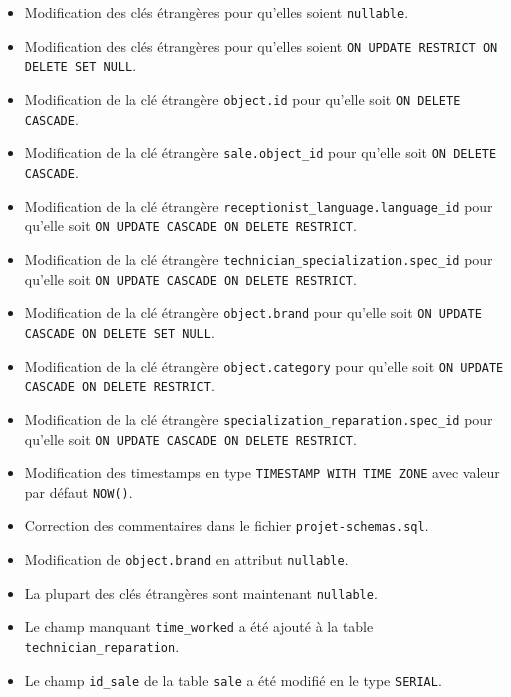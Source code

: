 \documentclass{article}
\newcommand{\ttt}{\texttt}
\begin{document}
\begin{itemize}
    \item Modification des clés étrangères pour qu'elles soient \ttt{nullable}.
    \item Modification des clés étrangères pour qu'elles soient \ttt{ON UPDATE RESTRICT ON DELETE SET NULL}.
    \item Modification de la clé étrangère \ttt{object.id} pour qu'elle soit \ttt{ON DELETE CASCADE}.
    \item Modification de la clé étrangère \ttt{sale.object\_id} pour qu'elle soit \ttt{ON DELETE CASCADE}.
    \item Modification de la clé étrangère \ttt{receptionist\_language.language\_id} pour qu'elle soit \ttt{ON UPDATE CASCADE ON DELETE RESTRICT}.
    \item Modification de la clé étrangère \ttt{technician\_specialization.spec\_id} pour qu'elle soit \ttt{ON UPDATE CASCADE ON DELETE RESTRICT}.  
    \item Modification de la clé étrangère \ttt{object.brand} pour qu'elle soit \ttt{ON UPDATE CASCADE ON DELETE SET NULL}.
    \item Modification de la clé étrangère \ttt{object.category} pour qu'elle soit \ttt{ON UPDATE CASCADE ON DELETE RESTRICT}.
    \item Modification de la clé étrangère \ttt{specialization\_reparation.spec\_id} pour qu'elle soit \ttt{ON UPDATE CASCADE ON DELETE RESTRICT}.
    \item Modification des timestamps en type \ttt{TIMESTAMP WITH TIME ZONE} avec valeur par défaut \ttt{NOW()}.
    \item Correction des commentaires dans le fichier \ttt{projet-schemas.sql}.
    \item Modification de \ttt{object.brand} en attribut \ttt{nullable}.
    \item La plupart des clés étrangères sont maintenant \ttt{nullable}.
    \item Le champ manquant \ttt{time\_worked} a été ajouté à la table \ttt{technician\_reparation}.
    \item Le champ \ttt{id\_sale} de la table \ttt{sale} a été modifié en le type \ttt{SERIAL}.
\end{itemize}
\end{document}
